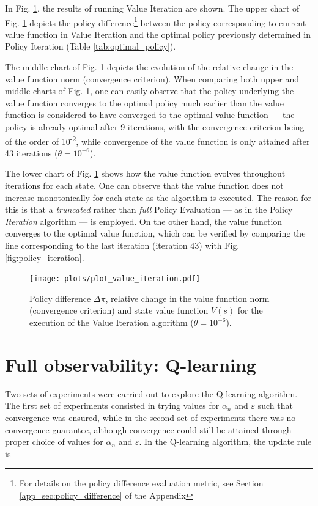\documentclass[a4paper]{article}
\begin{document}
In Fig. \ref{fig:value_iteration}, the results of running Value Iteration are shown. The upper chart of Fig. \ref{fig:value_iteration} depicts the policy difference\footnote{For details on the policy difference evaluation metric, see Section \ref{app_sec:policy_difference} of the Appendix} between the policy corresponding to current value function in Value Iteration and the optimal policy previously determined in Policy Iteration (Table \ref{tab:optimal_policy}).

The middle chart of Fig. \ref{fig:value_iteration} depicts the evolution of the relative change in the value function norm (convergence criterion). When comparing both upper and middle charts of Fig. \ref{fig:value_iteration}, one can easily observe that the policy underlying the value function converges to the optimal policy much earlier than the value function is considered to have converged to the optimal value function --- the policy is already optimal after 9 iterations, with the convergence criterion being of the order of 10\textsuperscript{-2}, while convergence of the value function is only attained after 43 iterations ($\theta = 10^{-6}$).

The lower chart of Fig. \ref{fig:value_iteration} shows how the value function evolves throughout iterations for each state. One can observe that the value function does not increase monotonically for each state as the algorithm is executed. The reason for this is that a \textit{truncated} rather than \textit{full} Policy Evaluation --- as in the Policy \textit{Iteration} algorithm --- is employed. On the other hand, the value function converges to the optimal value function, which can be verified by comparing the line corresponding to the last iteration (iteration 43) with Fig. \ref{fig:policy_iteration}.

\begin{figure}[htbp]
\centering
\texttt{[image: plots/plot\_value\_iteration.pdf]}
\caption{Policy difference $\Delta \pi$, relative change in the value function norm (convergence criterion) and state value function $V(s)$ for the execution of the Value Iteration algorithm ($\theta=10^{-6}$).}
\label{fig:value_iteration}
\end{figure}


\section{Full observability: Q-learning}

Two sets of experiments were carried out to explore the Q-learning algorithm. The first set of experiments consisted in trying values for $\alpha_n$ and $\varepsilon$ such that convergence was ensured, while in the second set of experiments there was no convergence guarantee, although convergence could still be attained through proper choice of values for $\alpha_n$ and $\varepsilon$. In the Q-learning algorithm, the update rule is
\end{document}
